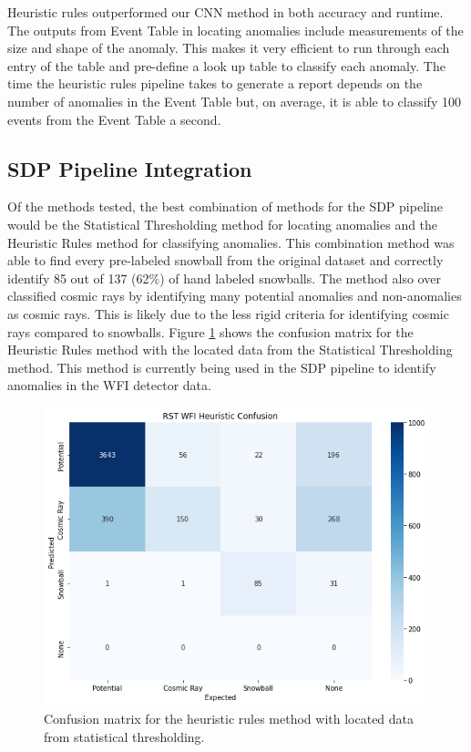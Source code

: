 Heuristic rules outperformed our CNN method in both accuracy and runtime.
The outputs from Event Table in locating anomalies include measurements of the size and shape of the anomaly. 
This makes it very efficient to run through each entry of the table and pre-define a look up table to classify each anomaly. 
The time the heuristic rules pipeline takes to generate a report depends on the number of anomalies in the Event Table but, on average, it is able to classify 100 events from the Event Table a second. 

\subsection{SDP Pipeline Integration}
Of the methods tested, the best combination of methods for the SDP pipeline would be the Statistical Thresholding method for locating anomalies and the Heuristic Rules method for classifying anomalies.
This combination method was able to find every pre-labeled snowball from the original dataset and correctly identify 85 out of 137 (62\%) of hand labeled snowballs. 
The method also over classified cosmic rays by identifying many potential anomalies and non-anomalies as cosmic rays.
This is likely due to the less rigid criteria for identifying cosmic rays compared to snowballs.
Figure \ref{rst/fig:heuristic_confusion} shows the confusion matrix for the Heuristic Rules method with the located data from the Statistical Thresholding method.
This method is currently being used in the SDP pipeline to identify anomalies in the WFI detector data.

\begin{figure}
    \centering
    \includegraphics[width=.7\textwidth]{figs/rst/heuristic_confusion.png}
    \caption{Confusion matrix for the heuristic rules method with located data from statistical thresholding.}
    \label{rst/fig:heuristic_confusion}
\end{figure}


